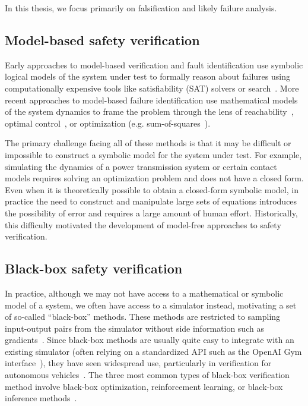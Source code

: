 In this thesis, we focus primarily on falsification and likely failure analysis.

\subsection{Model-based safety verification}

Early approaches to model-based verification and fault identification use symbolic logical models of the system under test to formally reason about failures using computationally expensive tools like satisfiability (SAT) solvers or search~\cite{dekleerDiagnosingMultipleFaults1987,benardRemoteAgentExperiment2000}. More recent approaches to model-based failure identification use mathematical models of the system dynamics to frame the problem through the lens of reachability~\cite{annpureddySTaLiRoToolTemporal2011,bansalHamiltonJacobiReachabilityBrief2017}, optimal control~\cite{chouUsingControlSynthesis2018}, or optimization (e.g. sum-of-squares~\cite{ahmadiApplicationsPolynomialOptimization2016,majumdarControlVerificationHighdimensional2014}).

The primary challenge facing all of these methods is that it may be difficult or impossible to construct a symbolic model for the system under test. For example, simulating the dynamics of a power transmission system or certain contact models requires solving an optimization problem and does not have a closed form. Even when it is theoretically possible to obtain a closed-form symbolic model, in practice the need to construct and manipulate large sets of equations introduces the possibility of error and requires a large amount of human effort. Historically, this difficulty motivated the development of model-free approaches to safety verification.

\subsection{Black-box safety verification}

In practice, although we may not have access to a mathematical or symbolic model of a system, we often have access to a simulator instead, motivating a set of so-called ``black-box'' methods. These methods are restricted to sampling input-output pairs from the simulator without side information such as gradients~\cite{corsoSurveyAlgorithmsBlackBox2021}. Since black-box methods are usually quite easy to integrate with an existing simulator (often relying on a standardized API such as the OpenAI Gym interface~\cite{brockmanOpenAIGym2016}), they have seen widespread use, particularly in verification for autonomous vehicles~\cite{xuSafeBenchBenchmarkingPlatform2022,riedmaierSurveyScenarioBasedSafety2020,okellyScalableEndtoEndAutonomous2018,corsoAdaptiveStressTesting2019,wangAdvSimGeneratingSafetyCritical2021,sunCornerCaseGeneration2021,zhongGuidedConditionalDiffusion2022,corsoInterpretableSafetyValidation2020a,zhangAdversarialRobustnessTrajectory2022,hanselmannKINGGeneratingSafetyCritical2022a}. The three most common types of black-box verification method involve black-box optimization, reinforcement learning, or black-box inference methods~\cite{corsoSurveyAlgorithmsBlackBox2021}.

